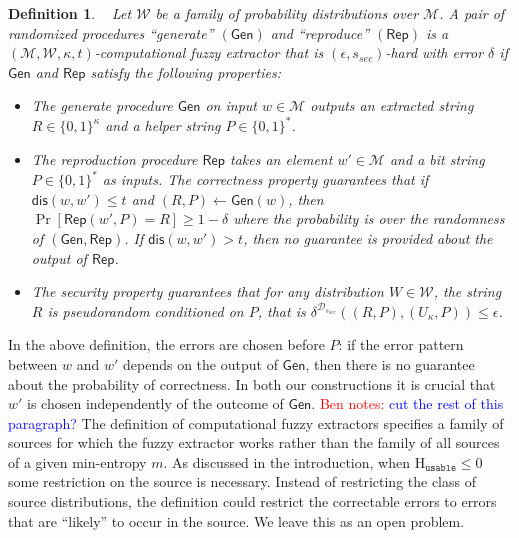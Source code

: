 \documentclass[11pt]{article}
\newcommand{\class}[1]{{\ensuremath{\mathsf{#1}}}}
\newcommand{\gen}{\ensuremath{\class{Gen}}\xspace}
\newcommand{\rep}{\ensuremath{\class{Rep}}\xspace}
\newcommand{\dis}{\ensuremath{\mathsf{dis}}}
\newcommand{\Huse}{\mathrm{H}_{\mathtt{usable}}}
\newtheorem{definition}[theorem]{Definition}
\newcommand{\authnote}[2]{{\textcolor{red}{\textsf{#1 notes: }\textcolor{blue}{ #2}}\marginpar{\textcolor{red}{\textbf{!!!!!}}}}}
\newcommand{\authnote}[2]{}
\newcommand{\bnote}[1]{{\authnote{Ben}{#1}}}
\begin{document}
\begin{definition}~\cite[Definition 2.5]{fuller2013computational}
\label{def:comp fuzzy extractor}
Let $\mathcal{W}$ be a family of probability distributions over $\mathcal{M}$. A pair of randomized procedures ``generate'' $(\gen)$ and ``reproduce'' $(\rep)$ is a $(\mathcal{M}, \mathcal{W}, \kappa, t)$-\emph{computational fuzzy extractor} that is $(\epsilon, s_{sec})$-hard with error $\delta$ if \gen and \rep satisfy the following properties:
\begin{itemize}
\item The generate procedure \gen on input $w\in \mathcal{M}$ outputs an extracted string $R\in\{0,1\}^\kappa$ and a helper string $P\in\{0,1\}^*$.
\item The reproduction procedure \rep takes an element $w'\in\mathcal{M}$ and a bit string $P\in\{0,1\}^*$ as inputs.  The \emph{correctness} property guarantees that if $\dis(w, w')\leq t$ and $(R, P)\leftarrow \gen(w)$, then $\Pr[\rep( w', P) = R] \geq 1-\delta$ where the probability is over the randomness of $(\gen, \rep)$.
If $\dis(w, w') > t$, then no guarantee is provided about the output of \rep.
\item The \emph{security} property guarantees that for any distribution $W\in \mathcal{W}$, the string $R$ is pseudorandom conditioned on $P$, that is $\delta^{\mathcal{D}_{s_{sec}}}((R, P), (U_\kappa, P))\leq \epsilon$.
\end{itemize}
\end{definition}
In the above definition, the errors are chosen before $P$: if the error pattern between $w$ and $w'$ depends on the output of $\gen$, then there is no guarantee about the probability of correctness. In both our constructions it is crucial that $w'$ is chosen independently of the outcome of \gen.
\bnote{cut the rest of this paragraph?} The definition of computational fuzzy extractors specifies a family of sources for which the fuzzy extractor works rather than the family of all sources of a given min-entropy $m$.  As discussed in the introduction, when $\Huse\le 0$ some restriction on the source is necessary.  Instead of restricting the class of source distributions, the definition could restrict the correctable errors to errors that are ``likely'' to occur in the source.  We leave this as an open problem.
\end{document}
